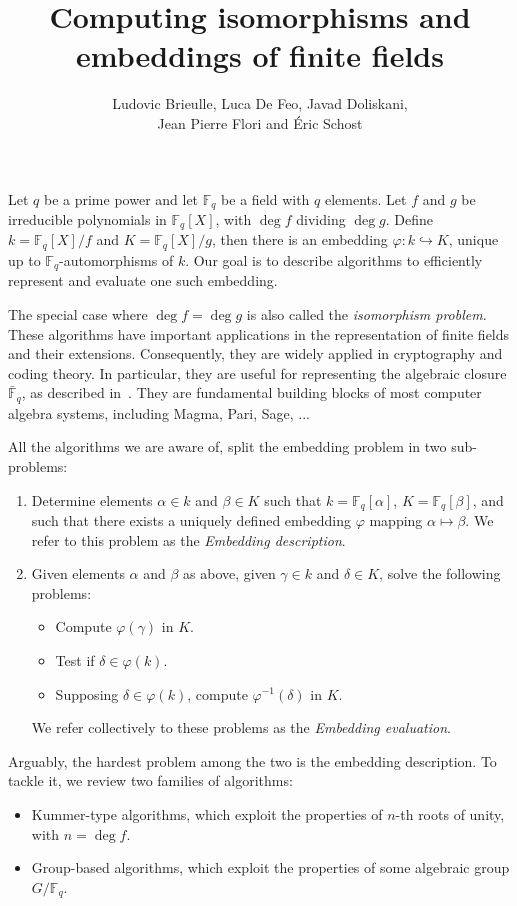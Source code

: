 \documentclass{article}
\title{Computing isomorphisms and embeddings of finite fields}
\author{Ludovic Brieulle, Luca De Feo, Javad Doliskani,\\ Jean Pierre
  Flori and Éric Schost}
\def\F {\ensuremath{\mathbb{F}}}
\begin{document}
\maketitle

Let $q$ be a prime power and let $\F_q$ be a field with $q$
elements. Let $f$ and $g$ be irreducible polynomials in $\F_q[X]$,
with $\deg f$ dividing $\deg g$. Define $k=\F_q[X]/f$ and
$K=\F_q[X]/g$, then there is an embedding $\varphi:k\hookrightarrow
K$, unique up to \mbox{$\F_q$-auto}morphisms of $k$. Our goal is to
describe algorithms to efficiently represent and evaluate one such
embedding.

The special case where $\deg f = \deg g$ is also called the
\emph{isomorphism problem}. These algorithms have important
applications in the representation of finite fields and their
extensions. Consequently, they are widely applied in cryptography and
coding theory. In particular, they are useful for representing the
algebraic closure $\bar{\F}_q$, as described
in~\cite{bosma+cannon+steel97}. They are fundamental building blocks
of most computer algebra systems, including Magma\cite{MAGMA},
Pari\cite{Pari}, Sage\cite{Sage}, ...

All the algorithms we are aware of, split the embedding problem in two
sub-problems:
\begin{enumerate}
\item Determine elements $\alpha\in k$ and $\beta\in K$ such that
  $k=\F_q[\alpha]$, $K=\F_q[\beta]$, and such that there exists a
  uniquely defined embedding $\varphi$ mapping
  $\alpha\mapsto\beta$. We refer to this problem as the
  \emph{Embedding description}.
\item Given elements $\alpha$ and $\beta$ as above, given $\gamma\in
  k$ and $\delta\in K$, solve the following problems:
  \begin{itemize}
  \item Compute $\varphi(\gamma)$ in $K$.
  \item Test if $\delta\in\varphi(k)$.
  \item Supposing $\delta\in\varphi(k)$, compute $\varphi^{-1}(\delta)$ in $K$.
  \end{itemize}
  We refer collectively to these problems as the \emph{Embedding
    evaluation}.
\end{enumerate}

Arguably, the hardest problem among the two is the embedding
description. To tackle it, we review two families of algorithms:
\begin{itemize}
\item Kummer-type algorithms, which exploit the properties of $n$-th
  roots of unity, with $n=\deg f$.
\item Group-based algorithms, which exploit the properties of some
  algebraic group $G/\F_q$.
\end{itemize}
\end{document}
